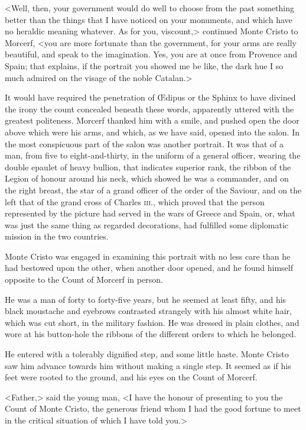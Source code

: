  <Well, then, your government would do well to choose from the past something better than the things that I have noticed on your monuments, and which have no heraldic meaning whatever. As for you, viscount,> continued Monte Cristo to Morcerf, <you are more fortunate than the government, for your arms are really beautiful, and speak to the imagination. Yes, you are at once from Provence and Spain; that explains, if the portrait you showed me be like, the dark hue I so much admired on the visage of the noble Catalan.> 

 It would have required the penetration of Œdipus or the Sphinx to have divined the irony the count concealed beneath these words, apparently uttered with the greatest politeness. Morcerf thanked him with a smile, and pushed open the door above which were his arms, and which, as we have said, opened into the salon. In the most conspicuous part of the salon was another portrait. It was that of a man, from five to eight-and-thirty, in the uniform of a general officer, wearing the double epaulet of heavy bullion, that indicates superior rank, the ribbon of the Legion of honour around his neck, which showed he was a commander, and on the right breast, the star of a grand officer of the order of the Saviour, and on the left that of the grand cross of Charles \textsc{iii.}, which proved that the person represented by the picture had served in the wars of Greece and Spain, or, what was just the same thing as regarded decorations, had fulfilled some diplomatic mission in the two countries. 

 Monte Cristo was engaged in examining this portrait with no less care than he had bestowed upon the other, when another door opened, and he found himself opposite to the Count of Morcerf in person. 

 He was a man of forty to forty-five years, but he seemed at least fifty, and his black moustache and eyebrows contrasted strangely with his almost white hair, which was cut short, in the military fashion. He was dressed in plain clothes, and wore at his button-hole the ribbons of the different orders to which he belonged. 

 He entered with a tolerably dignified step, and some little haste. Monte Cristo saw him advance towards him without making a single step. It seemed as if his feet were rooted to the ground, and his eyes on the Count of Morcerf. 

 <Father,> said the young man, <I have the honour of presenting to you the Count of Monte Cristo, the generous friend whom I had the good fortune to meet in the critical situation of which I have told you.> 

